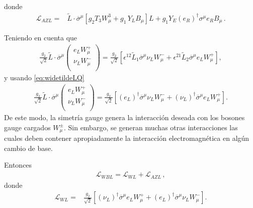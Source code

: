 \begin{frame}
donde
\begin{align}
\label{eq:lazl}
  \mathcal{L}_{A Z L}=& \widetilde{L}\cdot\overline{\sigma}^\mu\left[g_2 T_3W_\mu^3+{g_1}\,Y_LB_\mu\right]L+ {g_1} Y_E\left(e_R \right)^{\dagger}\sigma^\mu  {e_R} B_\mu\,.
\end{align}

Teniendo en cuenta que 
\begin{align}
  \frac{g_2}{\sqrt{2}}\widetilde{L}\cdot\overline{\sigma}^\mu
  \begin{pmatrix}
e_LW_\mu^+\\
\nu_L W_\mu^-\\    
  \end{pmatrix}=\frac{g_2}{\sqrt{2}} \left[ \epsilon^{12} \widetilde{L}_1 \overline{\sigma}^{\mu} \nu_L W_{\mu}^-
+\epsilon^{21}  \widetilde{L}_2 \overline{\sigma}^{\mu} e_L W_{\mu}^+ \right],
\end{align}
y usando \eqref{eq:widetildeLQ}
\begin{align}
  \frac{g_2}{\sqrt{2}}\widetilde{L}\cdot\overline{\sigma}^\mu
  \begin{pmatrix}
e_LW_\mu^+\\
\nu_L W_\mu^-\\    
  \end{pmatrix}=\frac{g_2}{\sqrt{2}} \left[\left( e_L \right)^{\dagger} \overline{\sigma}^{\mu} \nu_L W_{\mu}^-
+ \left( \nu_L \right)^{\dagger} \overline{\sigma}^{\mu} e_L W_{\mu}^+ \right].
\end{align}
De este modo, la simetría gauge genera la interacción deseada con los bosones gauge cargados $W_{\mu}^{\pm}$. Sin embargo, se generan muchas otras interacciones las cuales deben contener apropiadamente la interacción electromagnética en algún cambio de base.

Entonces
\begin{align}
  \mathcal{L}_{WBL}= \mathcal{L}_{W L}+  \mathcal{L}_{A Z L}\,,
\end{align}
donde
\begin{align}
\label{eq:lwl}
  \mathcal{L}_{W L}=&\frac{g_2}{\sqrt{2}}\left[\left( \nu_L \right)^{\dagger}\overline{\sigma}^\mu e_LW_\mu^++
\left( e_L \right)^{\dagger}\overline{\sigma}^\mu\nu_L W_\mu^-\right].
\end{align}


\end{frame}
